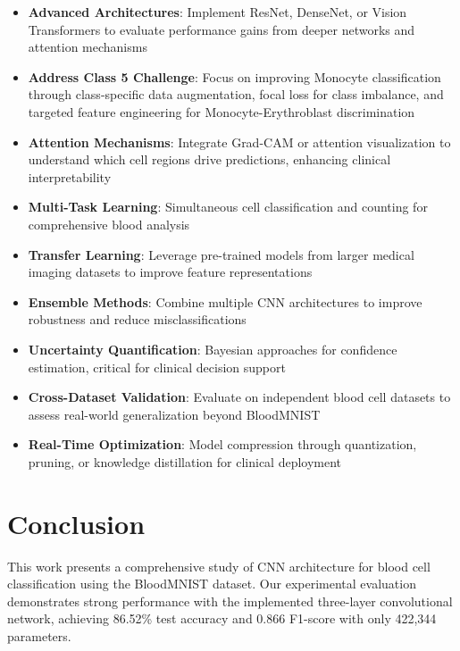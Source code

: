 \documentclass[runningheads]{llncs}
\begin{document}
\begin{itemize}
    \item \textbf{Advanced Architectures}: Implement ResNet, DenseNet, or Vision Transformers to evaluate performance gains from deeper networks and attention mechanisms
    
    \item \textbf{Address Class 5 Challenge}: Focus on improving Monocyte classification through class-specific data augmentation, focal loss for class imbalance, and targeted feature engineering for Monocyte-Erythroblast discrimination
    
    \item \textbf{Attention Mechanisms}: Integrate Grad-CAM or attention visualization to understand which cell regions drive predictions, enhancing clinical interpretability
    
    \item \textbf{Multi-Task Learning}: Simultaneous cell classification and counting for comprehensive blood analysis
    
    \item \textbf{Transfer Learning}: Leverage pre-trained models from larger medical imaging datasets to improve feature representations
    
    \item \textbf{Ensemble Methods}: Combine multiple CNN architectures to improve robustness and reduce misclassifications
    
    \item \textbf{Uncertainty Quantification}: Bayesian approaches for confidence estimation, critical for clinical decision support
    
    \item \textbf{Cross-Dataset Validation}: Evaluate on independent blood cell datasets to assess real-world generalization beyond BloodMNIST
    
    \item \textbf{Real-Time Optimization}: Model compression through quantization, pruning, or knowledge distillation for clinical deployment
\end{itemize}

\section{Conclusion}

This work presents a comprehensive study of CNN architecture for blood cell classification using the BloodMNIST dataset. Our experimental evaluation demonstrates strong performance with the implemented three-layer convolutional network, achieving 86.52\% test accuracy and 0.866 F1-score with only 422,344 parameters.
\end{document}

